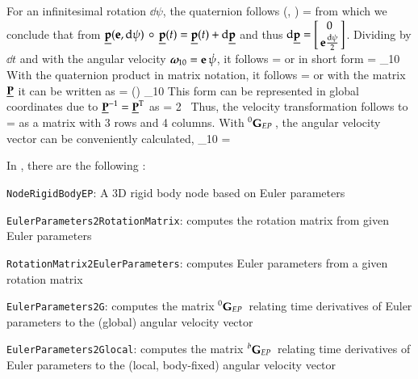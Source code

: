 \noindent For an infinitesimal rotation $\dd \psi$, the quaternion follows
\be
  \underline{\pv}(\ev, \dd \psi) =  \approx 
\ee
from which we conclude that from $\underline{\mathbf{p}}(\mathbf{e}, \mathrm{d} \psi) \, \circ \, \underline{\mathbf{p}}(t) = \underline{\mathbf{p}}(t) + \mathrm{d}\underline{\mathbf{p}}$ and thus $\dd\underline{\pv} = \vp{0}{\ev \frac{\dd\psi}{2}}$.
Dividing by $\dd t$ and with the angular velocity $\mbox{\boldmath $\omega$ \unboldmath}\!\!_{10} = \mathbf{e} \, \dot \psi$, it follows
\be
   =    \circ \vp{\ps}{\pv}
\ee
or in short form
\be
   =  \underline{\tomega}_{10}  \circ \underline{\pv}
\ee
With the quaternion product in matrix notation, it follows
\be
   =   
\ee
or with the matrix $\underline{\mathbf{P}}$ it can be written as
\be
   =  {\underline{\Pm}}(\pv) \underline{\tomega}_{10}    
\ee
This form can be represented in global coordinates due to ${\underline{\mathbf{P}}}^{-1} = {\underline{\mathbf{P}}}^\mathrm{T}$ as
\be
   = 2  \, 
\ee
Thus, the velocity transformation follows to
\be
   = 
\ee
as a matrix with 3 rows and 4 columns. With $\prescript{0}{}{\mathbf{G}}_{EP}\,$, the angular velocity vector can be conveniently calculated,
\be
  _{10} =  \, 
\ee

\noindent In \codeName, there are the following :
\bi
  \item \texttt{NodeRigidBodyEP}: A 3D rigid body node based on Euler parameters
  \item \texttt{EulerParameters2RotationMatrix}: computes the rotation matrix from given Euler parameters
  \item \texttt{RotationMatrix2EulerParameters}: computes Euler parameters from a given rotation matrix
  \item \texttt{EulerParameters2G}: computes the matrix $\prescript{0}{}{\mathbf{G}}_{EP}\,$ relating time derivatives of Euler parameters to the (global) angular velocity vector
  \item \texttt{EulerParameters2Glocal}: computes the matrix $\prescript{b}{}{\mathbf{G}}_{EP}\,$ relating time derivatives of Euler parameters to the (local, body-fixed) angular velocity vector
\ei



